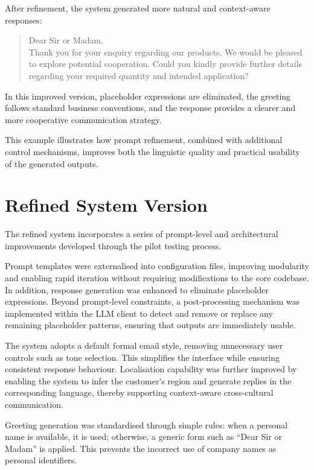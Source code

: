 \documentclass[12pt,a4paper]{report}
\begin{document}
After refinement, the system generated more natural and context-aware responses:

\begin{quote}
Dear Sir or Madam, \\

Thank you for your enquiry regarding our products. We would be pleased to explore potential cooperation. Could you kindly provide further details regarding your required quantity and intended application?
\end{quote}

In this improved version, placeholder expressions are eliminated, the greeting follows standard business conventions, and the response provides a clearer and more cooperative communication strategy. 

This example illustrates how prompt refinement, combined with additional control mechanisms, improves both the linguistic quality and practical usability of the generated outputs.

\section{Refined System Version}

The refined system incorporates a series of prompt-level and architectural improvements developed through the pilot testing process.

Prompt templates were externalised into configuration files, improving modularity and enabling rapid iteration without requiring modifications to the core codebase. In addition, response generation was enhanced to eliminate placeholder expressions. Beyond prompt-level constraints, a post-processing mechanism was implemented within the LLM client to detect and remove or replace any remaining placeholder patterns, ensuring that outputs are immediately usable.

The system adopts a default formal email style, removing unnecessary user controls such as tone selection. This simplifies the interface while ensuring consistent response behaviour. Localisation capability was further improved by enabling the system to infer the customer’s region and generate replies in the corresponding language, thereby supporting context-aware cross-cultural communication.

Greeting generation was standardised through simple rules: when a personal name is available, it is used; otherwise, a generic form such as “Dear Sir or Madam” is applied. This prevents the incorrect use of company names as personal identifiers.
\end{document}
